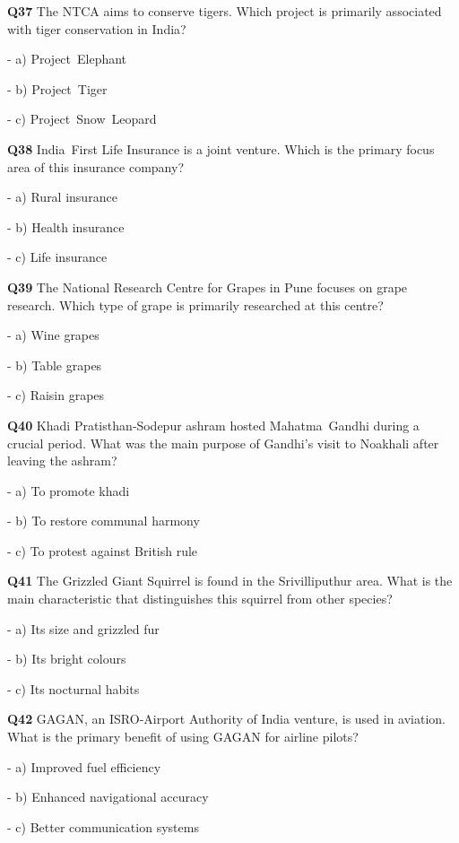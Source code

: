 \textbf{Q37} The NTCA aims to conserve tigers. Which project is primarily associated with tiger conservation in India?\par
\quad - a) Project Elephant\par
\quad - b) Project Tiger\par
\quad - c) Project Snow Leopard\par

\textbf{Q38} India First Life Insurance is a joint venture. Which is the primary focus area of this insurance company?\par
\quad - a) Rural insurance\par
\quad - b) Health insurance\par
\quad - c) Life insurance\par

\textbf{Q39} The National Research Centre for Grapes in Pune focuses on grape research. Which type of grape is primarily researched at this centre?\par
\quad - a) Wine grapes\par
\quad - b) Table grapes\par
\quad - c) Raisin grapes\par

\textbf{Q40} Khadi Pratisthan‑Sodepur ashram hosted Mahatma Gandhi during a crucial period. What was the main purpose of Gandhi's visit to Noakhali after leaving the ashram?\par
\quad - a) To promote khadi\par
\quad - b) To restore communal harmony\par
\quad - c) To protest against British rule\par

\textbf{Q41} The Grizzled Giant Squirrel is found in the Srivilliputhur area. What is the main characteristic that distinguishes this squirrel from other species?\par
\quad - a) Its size and grizzled fur\par
\quad - b) Its bright colours\par
\quad - c) Its nocturnal habits\par

\textbf{Q42} GAGAN, an ISRO‑Airport Authority of India venture, is used in aviation. What is the primary benefit of using GAGAN for airline pilots?\par
\quad - a) Improved fuel efficiency\par
\quad - b) Enhanced navigational accuracy\par
\quad - c) Better communication systems\par

